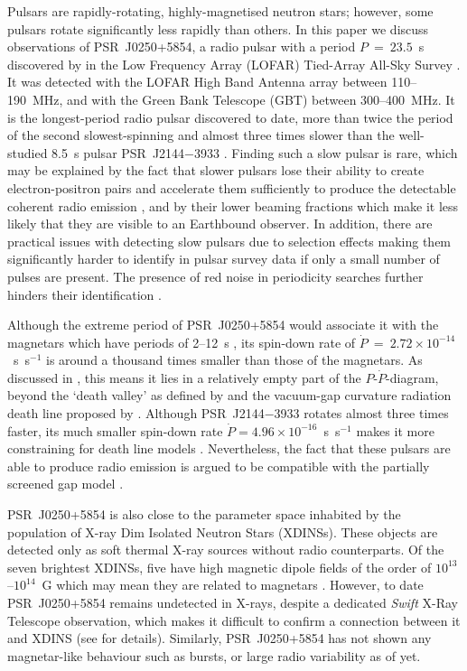Pulsars are rapidly-rotating, highly-magnetised neutron stars; however, some pulsars rotate significantly less rapidly than others. In this paper we discuss observations of PSR~J0250+5854, a radio pulsar with a period $P~=~23.5$~s discovered by \citet{TBC+2018} in the Low Frequency Array (LOFAR) Tied-Array All-Sky Survey \citep[LOTAAS;][]{SCB+2019}. It was detected with the LOFAR High Band Antenna array between 110--190~MHz, and with the Green Bank Telescope (GBT) between 300--400~MHz. It is the longest-period radio pulsar discovered to date, more than twice the period of the second slowest-spinning \citep[PSR~J2251$-$3711 at $P = 12.1$~s;][]{MKE+2020} and almost three times slower than the well-studied 8.5~s pulsar PSR~J2144$-$3933 \citep{YMJx1999}. Finding such a slow pulsar is rare, which may be explained by the fact that slower pulsars lose their ability to create electron-positron pairs and accelerate them sufficiently to produce the detectable coherent radio emission \citep{Sxxx1971}, and by their lower beaming fractions which make it less likely that they are visible to an Earthbound observer. In addition, there are practical issues with detecting slow pulsars due to selection effects making them significantly harder to identify in pulsar survey data if only a small number of pulses are present. The presence of red noise in periodicity searches further hinders their identification \citep[e.g.][]{LBH+2015,HKRx2017}.

Although the extreme period of PSR~J0250+5854 would associate it with the magnetars which have periods of 2--12~s \citep{OKxx2014}, its spin-down rate of $\dot{P}~=~2.72\times10^{-14}$~s~s$^{-1}$ is around a thousand times smaller than those of the magnetars. As discussed in \citet{TBC+2018}, this means it lies in a relatively empty part of the $P$-$\dot{P}$-diagram, beyond the `death valley' as defined by \citet{CRxx1993} and the vacuum-gap curvature radiation death line proposed by \citet{ZHMx2000}. Although PSR~J2144$-$3933 rotates almost three times faster, its much smaller spin-down rate $\dot{P} = 4.96\times10^{-16}$~s~s$^{-1}$ makes it more constraining for death line models \citep{MBMA2020}. Nevertheless, the fact that these pulsars are able to produce radio emission is argued to be compatible with the partially screened gap model \citep[e.g.][]{Sxxx2013}.

PSR~J0250+5854 is also close to the parameter space inhabited by the population of X-ray Dim Isolated Neutron Stars (XDINSs). These objects are detected only as soft thermal X-ray sources without radio counterparts. Of the seven brightest XDINSs, five have high magnetic dipole fields of the order of $10^{13}$--$10^{14}$~G which may mean they are related to magnetars \citep{Hxxx2007,KKxx2007}. However, to date PSR~J0250+5854 remains undetected in X-rays, despite a dedicated \textit{Swift} X-Ray Telescope observation, which makes it difficult to confirm a connection between it and XDINS (see \citealt{TBC+2018} for details). Similarly, PSR~J0250+5854 has not shown any magnetar-like behaviour such as bursts, or large radio variability as of yet.


